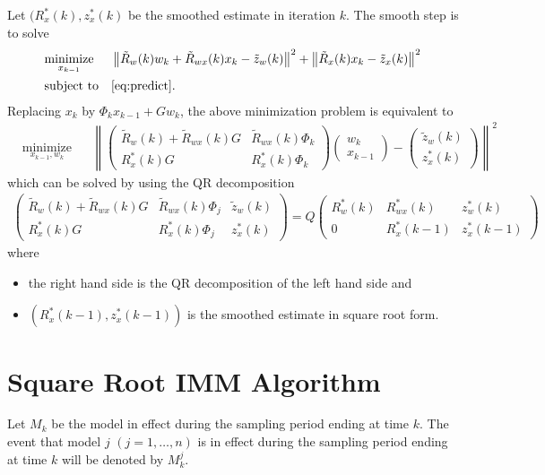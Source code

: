 \documentclass[microtype]{gtpart}     %
\theoremstyle{definition}
\newcommand{\norm}[1]{\left\lVert#1\right\rVert}
\begin{document}
Let $(R^*_x(k), z^*_x(k)$ be the smoothed estimate in iteration $k$.
The smooth step is to solve
\begin{align*}
	& \underset{x_{k-1}}{\text{minimize}} & &\norm{\tilde{R}_w(k)w_k + \tilde{R}_{wx}(k)x_k - \tilde{z}_w(k)}^2 +
	\norm{\tilde{R}_x(k)x_k - \tilde{z}_x(k)}^2 \\
	& \text{subject to} & & \cref{eq:predict}.
\end{align*}
Replacing $x_k$ by $\Phi_k x_{k-1} + Gw_k$, the above minimization problem is equivalent to
\begin{align*}
	& \underset{x_{k-1}, w_k}{\text{minimize}} & &\norm{
		\begin{pmatrix}
			\tilde{R}_w(k) + \tilde{R}_{wx}(k)G &\tilde{R}_{wx}(k)\Phi_k \\
			R^*_x(k)G &R^*_x(k)\Phi_k
		\end{pmatrix}
		\begin{pmatrix}
		w_k \\ x_{k-1}
		\end{pmatrix} - 
		\begin{pmatrix}
			\tilde{z}_w(k) \\ z^*_x(k)
		\end{pmatrix}}^2
\end{align*}
which can be solved by using the QR decomposition
\begin{align*}
	\begin{pmatrix}
		\tilde{R}_w(k) + \tilde{R}_{wx}(k)G &\tilde{R}_{wx}(k)\Phi_j &\tilde{z}_w(k) \\
		R^*_x(k)G &R^*_x(k)\Phi_j &z^*_x(k)
	\end{pmatrix} = Q
	\begin{pmatrix}
		R^*_w(k) &R^*_{wx}(k) &z^*_w(k) \\
		0 &R^*_x(k-1) &z^*_x(k-1)
	\end{pmatrix}
\end{align*}
where
\begin{itemize}
	\item the right hand side is the QR decomposition of the left hand side and
	\item $(R^*_x(k-1), z^*_x(k-1))$ is the smoothed estimate in square root form.
\end{itemize}

\section{Square Root IMM Algorithm}

Let $M_k$ be the model in effect during the sampling period ending at time $k$.
The event that model $j$ $(j=1,\ldots,n)$ is in effect during the sampling period ending at time $k$ will be denoted by $M^j_k$.
\end{document}
